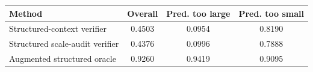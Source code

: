 \begin{tabular}{lccc}
\toprule
Method & Overall & Pred. too large & Pred. too small \\
\midrule
Structured-context verifier & 0.4503 & 0.0954 & 0.8190 \\
Structured scale-audit verifier & 0.4376 & 0.0996 & 0.7888 \\
Augmented structured oracle & 0.9260 & 0.9419 & 0.9095 \\
\bottomrule
\end{tabular}
